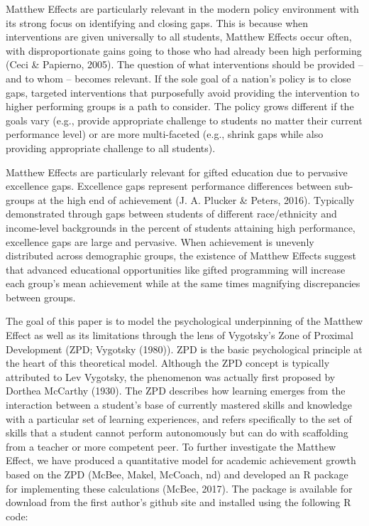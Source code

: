 \documentclass[english,floatsintext,jou]{apa6}
\theoremstyle{definition}
\theoremstyle{definition}
\theoremstyle{definition}
\theoremstyle{remark}
\begin{document}
\par

Matthew Effects are particularly relevant in the modern policy
environment with its strong focus on identifying and closing gaps. This
is because when interventions are given universally to all students,
Matthew Effects occur often, with disproportionate gains going to those
who had already been high performing (Ceci \& Papierno, 2005). The
question of what interventions should be provided -- and to whom --
becomes relevant. If the sole goal of a nation's policy is to close
gaps, targeted interventions that purposefully avoid providing the
intervention to higher performing groups is a path to consider. The
policy grows different if the goals vary (e.g., provide appropriate
challenge to students no matter their current performance level) or are
more multi-faceted (e.g., shrink gaps while also providing appropriate
challenge to all students).

Matthew Effects are particularly relevant for gifted education due to
pervasive excellence gaps. Excellence gaps represent performance
differences between sub-groups at the high end of achievement (J. A.
Plucker \& Peters, 2016). Typically demonstrated through gaps between
students of different race/ethnicity and income-level backgrounds in the
percent of students attaining high performance, excellence gaps are
large and pervasive. When achievement is unevenly distributed across
demographic groups, the existence of Matthew Effects suggest that
advanced educational opportunities like gifted programming will increase
each group's mean achievement while at the same times magnifying
discrepancies between groups.

The goal of this paper is to model the psychological underpinning of the
Matthew Effect as well as its limitations through the lens of Vygotsky's
Zone of Proximal Development (ZPD; Vygotsky (1980)). ZPD is the basic
psychological principle at the heart of this theoretical model. Although
the ZPD concept is typically attributed to Lev Vygotsky, the phenomenon
was actually first proposed by Dorthea McCarthy (1930). The ZPD
describes how learning emerges from the interaction between a student's
base of currently mastered skills and knowledge with a particular set of
learning experiences, and refers specifically to the set of skills that
a student cannot perform autonomously but can do with scaffolding from a
teacher or more competent peer. To further investigate the Matthew
Effect, we have produced a quantitative model for academic achievement
growth based on the ZPD (McBee, Makel, McCoach, nd) and developed an R
package for implementing these calculations (McBee, 2017). The package
is available for download from the first author's github site and
installed using the following R code:
\end{document}
